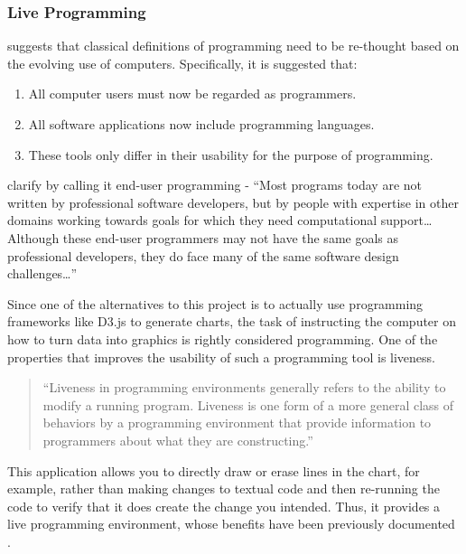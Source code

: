 	\subsubsection*{Live Programming}
	\cite{blackwell_what_2002} suggests that classical definitions of programming need to be re-thought based on the evolving use of computers. Specifically, it is suggested that:
	\begin{enumerate}
	\item All computer users must now be regarded as programmers. 
	\item All software applications now include programming languages.
	\item These tools only differ in their usability for the purpose of programming.
	\end{enumerate}
	
	\cite{ko_state_2011} clarify by calling it end-user programming - ``Most programs today are not written by professional software developers, but by people with expertise in other domains working towards goals for which they need computational support\ldots Although these end-user programmers may not have the same goals as professional developers, they do face many of the same software design challenges\ldots''
	
	Since one of the alternatives to this project is to actually use programming frameworks like D3.js to generate charts, the task of instructing the computer on how to turn data into graphics is rightly considered programming. One of the properties that improves the usability of such a programming tool is liveness.
	
	\begin{quote}
	 ``Liveness in programming environments generally refers to the ability to modify a running program. Liveness is one form of a more general class of behaviors by a programming environment that provide information to programmers about what they are constructing.''
	 \end{quote} 
	\begin{flushright}
	 \citep{tanimoto_perspective_2013}
	\end{flushright}
	
	This application allows you to directly draw or erase lines in the chart, for example, rather than making changes to textual code and then re-running the code to verify that it does create the change you intended. Thus, it provides a live programming environment, whose benefits have been previously documented \citep{tanimoto_perspective_2013}.	
	
